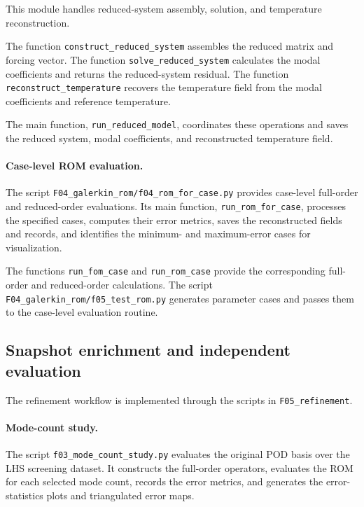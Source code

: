 This module handles reduced-system assembly,
solution, and temperature reconstruction.

The function \texttt{construct\_reduced\_system}
assembles the reduced matrix and forcing vector.
The function \texttt{solve\_reduced\_system}
calculates the modal coefficients and returns
the reduced-system residual. The function
\texttt{reconstruct\_temperature} recovers the
temperature field from the modal coefficients
and reference temperature.

The main function, \texttt{run\_reduced\_model},
coordinates these operations and saves the
reduced system, modal coefficients, and
reconstructed temperature field.

\paragraph{Case-level ROM evaluation.}

The script
\texttt{F04\_galerkin\_rom/f04\_rom\_for\_case.py}
provides case-level full-order and reduced-order
evaluations. Its main function,
\texttt{run\_rom\_for\_case}, processes the
specified cases, computes their error metrics,
saves the reconstructed fields and records,
and identifies the minimum- and maximum-error
cases for visualization.

The functions \texttt{run\_fom\_case} and
\texttt{run\_rom\_case} provide the corresponding
full-order and reduced-order calculations.
The script
\texttt{F04\_galerkin\_rom/f05\_test\_rom.py}
generates parameter cases and passes them to
the case-level evaluation routine.

\subsection{Snapshot enrichment and independent evaluation}

The refinement workflow is implemented through
the scripts in \texttt{F05\_refinement}.

\paragraph{Mode-count study.}

The script
\texttt{f03\_mode\_count\_study.py}
evaluates the original POD basis over the LHS
screening dataset. It constructs the full-order
operators, evaluates the ROM for each selected
mode count, records the error metrics, and
generates the error-statistics plots and
triangulated error maps.

